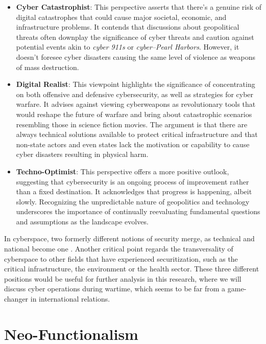 \begin{itemize}
    \item \textbf{Cyber Catastrophist}: This perspective asserts that there's a genuine risk of digital catastrophes that could cause major societal, economic, and infrastructure problems. It contends that discussions about geopolitical threats often downplay the significance of cyber threats and caution against potential events akin to \textit{cyber 911s} or \textit{cyber–Pearl Harbors}. However, it doesn't foresee cyber disasters causing the same level of violence as weapons of mass destruction.
    \item \textbf{Digital Realist}: This viewpoint highlights the significance of concentrating on both offensive and defensive cybersecurity, as well as strategies for cyber warfare. It advises against viewing cyberweapons as revolutionary tools that would reshape the future of warfare and bring about catastrophic scenarios resembling those in science fiction movies. The argument is that there are always technical solutions available to protect critical infrastructure and that non-state actors and even states lack the motivation or capability to cause cyber disasters resulting in physical harm.
    \item \textbf{Techno-Optimist}: This perspective offers a more positive outlook, suggesting that cybersecurity is an ongoing process of improvement rather than a fixed destination. It acknowledges that progress is happening, albeit slowly. Recognizing the unpredictable nature of geopolitics and technology underscores the importance of continually reevaluating fundamental questions and assumptions as the landscape evolves.
\end{itemize}

In cyberspace, two formerly different notions of security merge, as technical and national become one \autocite{balzacq_2016_securitization}. Another critical point regards the transversality of cyberspace to other fields that have experienced securitization, such as the critical infrastructure, the environment or the health sector.  These three different positions would be useful for further analysis in this research, where we will discuss cyber operations during wartime, which seems to be far from a game-changer in international relations. 

\section{Neo-Functionalism}

